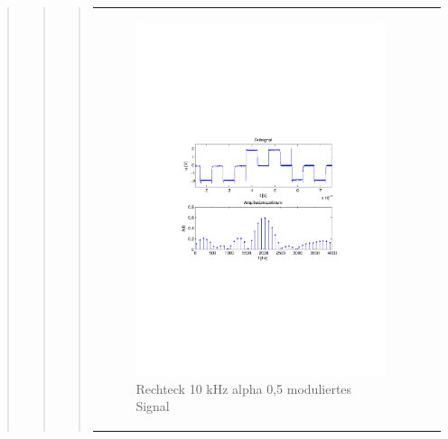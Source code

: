 \begin{quote}
\begin{quote}
\begin{quote}
\begin{center}
\begin{tabular}{ll}
            \hspace{-5cm}
                \begin{minipage}{0.6\textwidth}
                    \begin{figure}[H]
                        \includegraphics[scale=0.7, trim = 35mm 100mm 35mm 95mm, clip]{Bilder/flatrec10_05abget_zeit}
                          \caption{Rechteck 10 kHz alpha 0,5 moduliertes Signal}
		                  \label{fig:flatrec10_05zeit}
                    \end{figure}
                \end{minipage}
                

\end{tabular}
\end{center}
\end{quote}
\end{quote}
\end{quote}
